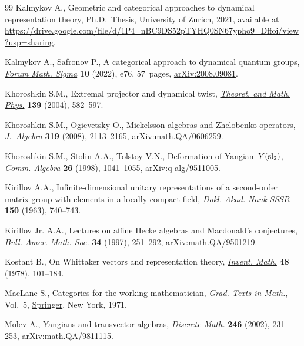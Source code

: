 \documentclass[10pt,a4paper]{amsart}
\numberwithin{equation}{section}
\begin{document}
\begin{thebibliography}{99}
Kalmykov A., Geometric and categorical approaches to dynamical representation theory, Ph.D.~Thesis, {U}niversity of Zurich, 2021, available at
 \url{https://drive.google.com/file/d/1P4_nBC9DS52pTYHQ0SN67ypho9_Dffoi/view?usp=sharing}.

Kalmykov A., Safronov P., A categorical approach to dynamical quantum groups,
 \href{https://doi.org/10.1017/fms.2022.68}{\textit{Forum Math. Sigma}} \textbf{10} (2022), e76, 57~pages,
 \href{https://arxiv.org/abs/2008.09081}{arXiv:2008.09081}.

Khoroshkin S.M., Extremal projector and dynamical twist, \href{https://doi.org/10.1023/B:TAMP.0000022749.42512.fd}{\textit{Theoret. and
 Math. Phys.}} \textbf{139} (2004), 582--597.

Khoroshkin S.M., Ogievetsky O., Mickelsson algebras and {Z}helobenko operators,
  \href{https://doi.org/10.1016/j.jalgebra.2007.04.020}{\textit{J.~Algebra}} \textbf{319} (2008), 2113--2165,
 \href{https://arxiv.org/abs/math.QA/0606259}{arXiv:math.QA/0606259}.

Khoroshkin S.M., Stolin A.A., Tolstoy V.N., Deformation of {Y}angian~{$Y({\rm
 sl}_2)$}, \href{https://doi.org/10.1080/00927879808826182}{\textit{Comm. Algebra}} \textbf{26} (1998), 1041--1055,
 \href{https://arxiv.org/abs/q-alg/9511005}{arXiv:q-alg/9511005}.

Kirillov A.A., Infinite-dimensional unitary representations of a second-order
 matrix group with elements in a locally compact field, \textit{Dokl. Akad.
 Nauk SSSR} \textbf{150} (1963), 740--743.

Kirillov Jr. A.A., Lectures on affine {H}ecke algebras and {M}acdonald's
 conjectures, \href{https://doi.org/10.1090/S0273-0979-97-00727-1}{\textit{Bull. Amer. Math. Soc.}} \textbf{34} (1997), 251--292,
 \href{https://arxiv.org/abs/math.QA/9501219}{arXiv:math.QA/9501219}.

Kostant B., On {W}hittaker vectors and representation theory, \href{https://doi.org/10.1007/BF01390249}{\textit{Invent.
 Math.}} \textbf{48} (1978), 101--184.

MacLane S., Categories for the working mathematician, \textit{Grad. Texts in
 Math.}, Vol.~5, \href{https://doi.org/10.1007/978-1-4757-4721-8}{Springer}, New York, 1971.

Molev A., Yangians and transvector algebras, \href{https://doi.org/10.1016/S0012-365X(01)00260-6}{\textit{Discrete Math.}} \textbf{246} (2002), 231--253,
 \href{https://arxiv.org/abs/math.QA/9811115}{arXiv:math.QA/9811115}.


\end{thebibliography}
\end{document}
